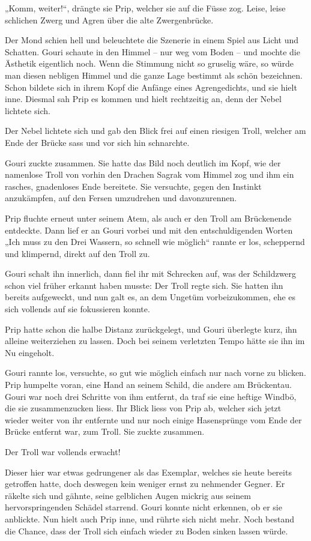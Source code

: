 „Komm, weiter!“, drängte sie Prip, welcher sie auf die Füsse zog. Leise, leise schlichen Zwerg und Agren über die alte Zwergenbrücke.

Der Mond schien hell und beleuchtete die Szenerie in einem Spiel aus Licht und Schatten. Gouri schaute in den Himmel – nur weg vom Boden – und mochte die Ästhetik eigentlich noch. Wenn die Stimmung nicht so gruselig wäre, so würde man diesen nebligen Himmel und die ganze Lage bestimmt als schön bezeichnen. Schon bildete sich in ihrem Kopf die Anfänge eines Agrengedichts, und sie hielt inne. Diesmal sah Prip es kommen und hielt rechtzeitig an, denn der Nebel lichtete sich.

Der Nebel lichtete sich und gab den Blick frei auf einen riesigen Troll, welcher am Ende der Brücke sass und vor sich hin schnarchte.

Gouri zuckte zusammen. Sie hatte das Bild noch deutlich im Kopf, wie der namenlose Troll von vorhin den Drachen Sagrak vom Himmel zog und ihm ein rasches, gnadenloses Ende bereitete. Sie versuchte, gegen den Instinkt anzukämpfen, auf den Fersen umzudrehen und davonzurennen.

Prip fluchte erneut unter seinem Atem, als auch er den Troll am Brückenende entdeckte. Dann lief er an Gouri vorbei und mit den entschuldigenden Worten „Ich muss zu den Drei Wassern, so schnell wie möglich“ rannte er los, scheppernd und klimpernd, direkt auf den Troll zu.

Gouri schalt ihn innerlich, dann fiel ihr mit Schrecken auf, was der Schildzwerg schon viel früher erkannt haben musste: Der Troll regte sich. Sie hatten ihn bereits aufgeweckt, und nun galt es, an dem Ungetüm vorbeizukommen, ehe es sich vollends auf sie fokussieren konnte.

Prip hatte schon die halbe Distanz zurückgelegt, und Gouri überlegte kurz, ihn alleine weiterziehen zu lassen. Doch bei seinem verletzten Tempo hätte sie ihn im Nu eingeholt.

Gouri rannte los, versuchte, so gut wie möglich einfach nur nach vorne zu blicken. Prip humpelte voran, eine Hand an seinem Schild, die andere am Brückentau. Gouri war noch drei Schritte von ihm entfernt, da traf sie eine heftige Windbö, die sie zusammenzucken liess. Ihr Blick liess von Prip ab, welcher sich jetzt wieder weiter von ihr entfernte und nur noch einige Hasensprünge vom Ende der Brücke entfernt war, zum Troll. Sie zuckte zusammen.

Der Troll war vollends erwacht!

Dieser hier war etwas gedrungener als das Exemplar, welches sie heute bereits getroffen hatte, doch deswegen kein weniger ernst zu nehmender Gegner. Er räkelte sich und gähnte, seine gelblichen Augen mickrig aus seinem hervorspringenden Schädel starrend. Gouri konnte nicht erkennen, ob er sie anblickte. Nun hielt auch Prip inne, und rührte sich nicht mehr. Noch bestand die Chance, dass der Troll sich einfach wieder zu Boden sinken lassen würde.

